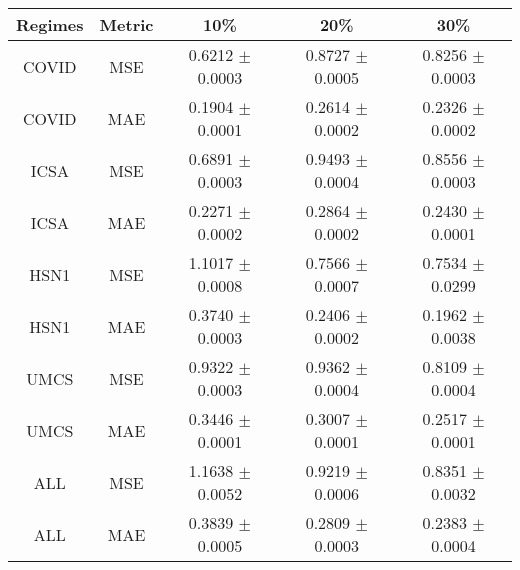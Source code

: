 {\begin{tabular}{ccccc}
\multicolumn{1}{c}{\textbf{Regimes}} & \multicolumn{1}{c}{\textbf{Metric}} & \textbf{10\%}       & \textbf{20\%}       & \textbf{30\%}       \\ \hline
\multicolumn{1}{c}{COVID}            & \multicolumn{1}{c}{MSE}             & 0.6212 $\pm$ 0.0003 & 0.8727 $\pm$ 0.0005 & 0.8256 $\pm$ 0.0003 \\
\multicolumn{1}{c}{COVID}            & \multicolumn{1}{c}{MAE}             & 0.1904 $\pm$ 0.0001 & 0.2614 $\pm$ 0.0002 & 0.2326 $\pm$ 0.0002 \\ \hline
\multicolumn{1}{c}{ICSA}             & \multicolumn{1}{c}{MSE}             & 0.6891 $\pm$ 0.0003 & 0.9493 $\pm$ 0.0004 & 0.8556 $\pm$ 0.0003 \\
\multicolumn{1}{c}{ICSA}             & \multicolumn{1}{c}{MAE}             & 0.2271 $\pm$ 0.0002 & 0.2864 $\pm$ 0.0002 & 0.2430 $\pm$ 0.0001 \\ \hline
\multicolumn{1}{c}{HSN1}             & \multicolumn{1}{c}{MSE}             & 1.1017 $\pm$ 0.0008 & 0.7566 $\pm$ 0.0007 & 0.7534 $\pm$ 0.0299 \\
\multicolumn{1}{c}{HSN1}             & \multicolumn{1}{c}{MAE}             & 0.3740 $\pm$ 0.0003 & 0.2406 $\pm$ 0.0002 & 0.1962 $\pm$ 0.0038 \\ \hline
\multicolumn{1}{c}{UMCS}             & \multicolumn{1}{c}{MSE}             & 0.9322 $\pm$ 0.0003 & 0.9362 $\pm$ 0.0004 & 0.8109 $\pm$ 0.0004 \\
\multicolumn{1}{c}{UMCS}             & \multicolumn{1}{c}{MAE}             & 0.3446 $\pm$ 0.0001 & 0.3007 $\pm$ 0.0001 & 0.2517 $\pm$ 0.0001 \\ \hline
\multicolumn{1}{c}{ALL}              & \multicolumn{1}{c}{MSE}             & 1.1638 $\pm$ 0.0052 & 0.9219 $\pm$ 0.0006 & 0.8351 $\pm$ 0.0032 \\
\multicolumn{1}{c}{ALL}              & \multicolumn{1}{c}{MAE}             & 0.3839 $\pm$ 0.0005 & 0.2809 $\pm$ 0.0003 & 0.2383 $\pm$ 0.0004 \\ \hline
\end{tabular}}